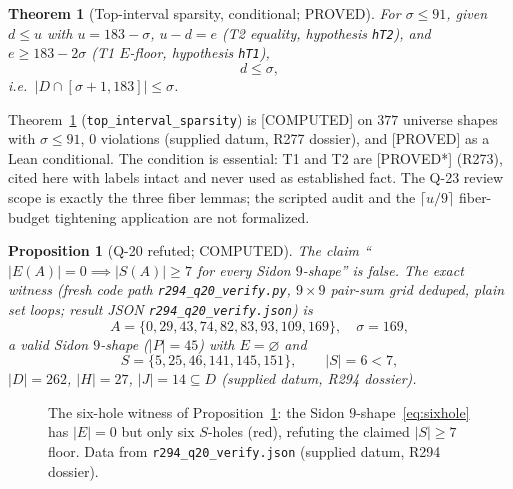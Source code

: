 \documentclass[11pt,a4paper]{article}
\newtheorem{theorem}{Theorem}
\newtheorem{proposition}{Proposition}
\theoremstyle{definition}
\begin{document}
\begin{theorem}[Top-interval sparsity, conditional; PROVED]
  \label{thm:sparsity}
  For $\sigma\le91$, given $d\le u$ with $u=183-\sigma$,
  $u-d=e$ (T2 equality, hypothesis \texttt{hT2}), and
  $e\ge183-2\sigma$ (T1 $E$-floor, hypothesis \texttt{hT1}),
  \begin{equation}
    \label{eq:sparsity}
    d\le\sigma,
  \end{equation}
  i.e.\ $|D\cap[\sigma+1,183]|\le\sigma$.
\end{theorem}

Theorem~\ref{thm:sparsity} (\texttt{top\_interval\_sparsity}) is
[COMPUTED] on $377$ universe shapes with $\sigma\le91$, $0$ violations
(supplied datum, R277 dossier), and [PROVED] as a Lean conditional. The
condition is essential: T1 and T2 are [PROVED*] (R273), cited here with
labels intact and never used as established fact. The Q-23 review scope
is exactly the three fiber lemmas; the scripted audit and the
$\lceil u/9\rceil$ fiber-budget tightening application are not
formalized.

\begin{proposition}[Q-20 refuted; COMPUTED]
  \label{prop:q20}
  The claim ``$|E(A)|=0\implies|S(A)|\ge7$ for every Sidon $9$-shape''
  is false. The exact witness (fresh code path
  \texttt{r294\_q20\_verify.py}, $9\times9$ pair-sum grid deduped,
  plain set loops; result JSON \texttt{r294\_q20\_verify.json}) is
  \begin{equation}
    \label{eq:sixhole}
    A=\{0,29,43,74,82,83,93,109,169\},\quad\sigma=169,
  \end{equation}
  a valid Sidon $9$-shape ($|P|=45$) with $E=\varnothing$ and
  \begin{equation}
    S=\{5,25,46,141,145,151\},\qquad |S|=6<7,
  \end{equation}
  $|D|=262$, $|H|=27$, $|J|=14\subseteq D$ (supplied datum, R294
  dossier).
\end{proposition}

\begin{figure}[t]
  \centering
  \caption{The six-hole witness of Proposition~\ref{prop:q20}: the Sidon
    $9$-shape~\eqref{eq:sixhole} has $|E|=0$ but only six $S$-holes
    (red), refuting the claimed $|S|\ge7$ floor. Data from
    \texttt{r294\_q20\_verify.json} (supplied datum, R294 dossier).}
  \label{fig:sixhole}
\end{figure}
\end{document}
